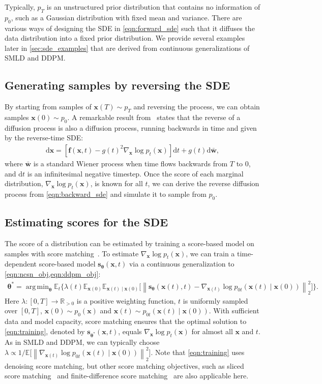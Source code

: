 \documentclass{article} %
\newcommand{\mbb}[1]{\mathbb{#1}}
\newcommand{\ud}{\mathrm{d}}
\newcommand{\norm}[1]{\left\lVert#1\right\rVert}
\DeclareMathOperator*{\argmin}{arg\,min}
\newcommand{\bfx}{\mathbf{x}}
\newcommand{\bfw}{\mathbf{w}}
\newcommand{\bff}{\mathbf{f}}
\newcommand{\bftheta}{{\boldsymbol{\theta}}}
\newcommand{\bfs}{\mathbf{s}}
\begin{document}
Typically, $p_T$ is an unstructured prior distribution that contains no information of $p_0$, such as a Gaussian distribution with fixed mean and variance. There are various ways of designing the SDE in \cref{eqn:forward_sde} such that it diffuses the data distribution into a fixed prior distribution. We provide several examples later in \cref{sec:sde_examples} that are derived from continuous generalizations of SMLD and DDPM.

\subsection{Generating samples by reversing the SDE}\label{sec:sde_reverse}
By starting from samples of $\bfx(T) \sim p_T$ and reversing the process, we can obtain samples $\bfx(0)\sim p_0$. %
A remarkable result from~\citet{Anderson1982-ny} states that the reverse of a diffusion process is also a diffusion process, running backwards in time and given by the reverse-time SDE:
\begin{align}
    \ud \bfx = [\bff(\bfx, t) - g(t)^2  \nabla_{\bfx}  \log p_t(\bfx)] \ud t + g(t) \ud \bar{\bfw},\label{eqn:backward_sde}
\end{align}
where $\bar{\bfw}$ is a standard Wiener process
when time flows backwards from $T$ to $0$, and $\ud t$ is an infinitesimal negative timestep. Once the score of each marginal distribution, $\nabla_\bfx \log p_t(\bfx)$, is known for all $t$, we can derive the reverse diffusion process from \cref{eqn:backward_sde} and simulate it to sample from $p_0$.


\subsection{Estimating scores for the SDE}\label{sec:training}
The score of a distribution can be estimated by training a score-based model on samples with score matching~\citep{hyvarinen2005estimation,song2019sliced}. To estimate $\nabla_\bfx \log p_t(\bfx)$, we can train a time-dependent score-based model $\bfs_\bftheta(\bfx, t)$ via a continuous generalization to \cref{eqn:ncsn_obj,eqn:ddpm_obj}:
\begin{align}
   \bftheta^* = \argmin_\bftheta 
   \mbb{E}_{t}\Big\{\lambda(t) \mbb{E}_{\bfx(0)}\mbb{E}_{\bfx(t) \mid \bfx(0) }
   \big[\norm{\bfs_\bftheta(\bfx(t), t) - \nabla_{\bfx(t)}\log p_{0t}(\bfx(t) \mid \bfx(0))}_2^2 \big]\Big\}%
   . \label{eqn:training}
\end{align}
Here $\lambda: [0, T] \to \mbb{R}_{>0}$ is a positive weighting function, $t$ is uniformly sampled over $[0, T]$, $\bfx(0) \sim p_0(\bfx)$ and $\bfx(t) \sim p_{0t}(\bfx(t) \mid \bfx(0))$. With sufficient data and model capacity, score matching ensures that the optimal solution to \cref{eqn:training}, denoted by $\bfs_{\bftheta^\ast}(\bfx, t)$, equals $\nabla_\bfx \log p_t(\bfx)$ for almost all $\bfx$ and $t$. As in SMLD and DDPM, we can typically choose $\lambda \propto 1/{\mbb{E}\big[\norm{\nabla_{\bfx(t)}\log p_{0t}(\bfx(t) \mid \bfx(0))}_2^2\big]}$. Note that \cref{eqn:training} uses denoising score matching, but other score matching objectives, such as sliced score matching~\citep{song2019sliced} and finite-difference score matching~\citep{pang2020efficient} are also applicable here. 
\end{document}

